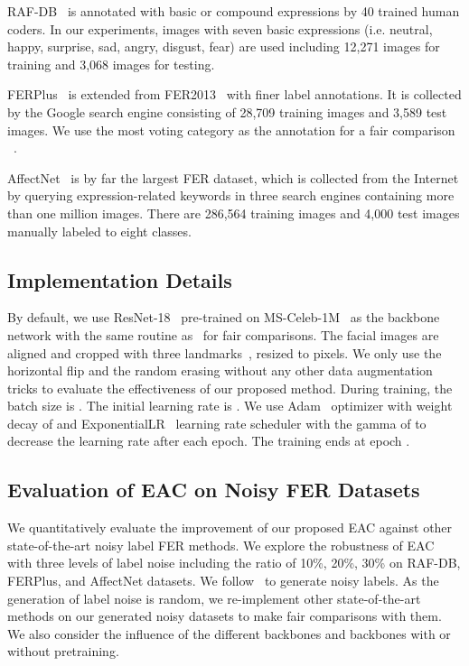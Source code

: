 \documentclass[runningheads]{llncs}
\begin{document}
RAF-DB~\cite{li2017reliable} is annotated with basic or compound expressions by 40 trained human coders. In our experiments, images with seven basic expressions (i.e. neutral, happy, surprise, sad, angry, disgust, fear) are used including 12,271 images for training and 3,068 images for testing. 

FERPlus~\cite{barsoum2016training} is extended from FER2013~\cite{goodfellow2013challenges} with finer label annotations. It is collected by the Google search engine consisting of 28,709 training images and 3,589 test images. We use the most voting category as the annotation for a fair comparison ~\cite{barsoum2016training, wang2020suppressing, wang2020region}.

AffectNet~\cite{mollahosseini2017affectnet} is by far the largest FER dataset, which is collected from the Internet by querying expression-related keywords in three search engines containing more than one million images. There are 286,564 training images and 4,000 test images manually labeled to eight classes. 

\subsection{Implementation Details}
By default, we use ResNet-18~\cite{he2016deep} pre-trained on MS-Celeb-1M~\cite{guo2016ms} as the backbone network with the same routine as~\cite{wang2020suppressing, wang2020region, zhang2021relative, she2021dive} for fair comparisons. The facial images are aligned and cropped with three landmarks~\cite{wang2019adaptive}, resized to  pixels. We only use the horizontal flip and the random erasing without any other data augmentation tricks to evaluate the effectiveness of our proposed method. During training, the batch size is . The initial learning rate is . We use Adam~\cite{kingma2014adam} optimizer with weight decay of  and ExponentialLR~\cite{li2019exponential} learning rate scheduler with the gamma of  to decrease the learning rate after each epoch. The training ends at epoch . 


\subsection{Evaluation of EAC on Noisy FER Datasets}

We quantitatively evaluate the improvement of our proposed EAC against other state-of-the-art noisy label FER methods. We explore the robustness of EAC with three levels of label noise including the ratio of 10\%, 20\%, 30\% on RAF-DB, FERPlus, and AffectNet datasets. We follow~\cite{wang2020suppressing, zhang2021relative, she2021dive} to generate noisy labels. As the generation of label noise is random, we re-implement other state-of-the-art methods on our generated noisy datasets to make fair comparisons with them. We also consider the influence of the different backbones and backbones with or without pretraining.
\end{document}
